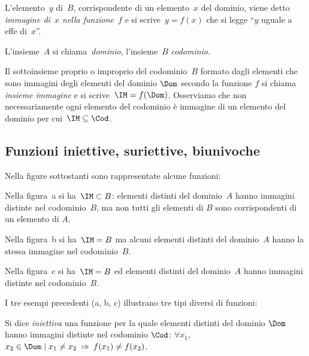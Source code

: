 \begin{definizione}\label{def:immagine_di_f}
 L'elemento~$y$ di~$B$, corrispondente di un elemento~$x$ del dominio, viene detto \emph{immagine di~$x$ nella funzione~$f$} e
si scrive~$y = f(x)$ che si legge ``$y$ uguale a effe di~$x$''.
\end{definizione}

L'insieme~$A$ si chiama~\emph{dominio}, l'insieme~$B$ \emph{codominio}.

Il sottoinsieme proprio o improprio del codominio~$B$ formato dagli elementi che sono
immagini degli elementi del dominio $\Dom$ secondo la funzione $f$ si chiama
\emph{insieme immagine} e si scrive~$\IM = f(\Dom)$. Osserviamo che non necessariamente
ogni elemento del codominio è immagine di un elemento del dominio per cui~$\IM\subseteq \Cod$.

 \vspazio\ovalbox{\risolvii \ref{ese:8.1}, \ref{ese:8.2}, \ref{ese:8.3}}

\subsection{Funzioni iniettive, suriettive, biunivoche}

\begin{exrig}
 \begin{esempio}
Nella figure sottostanti sono rappresentate alcune funzioni:
\begin{center}
 
\end{center}

Nella figura~a si ha~$\IM\subset B$: elementi distinti del dominio~$A$ hanno immagini distinte nel codominio~$B$, ma non tutti gli elementi di $B$ sono corrispondenti di un elemento di $A$.

Nella figura~b si ha~$\IM=B$ ma alcuni elementi distinti del dominio~$A$ hanno la stessa immagine nel codominio~$B$.

Nella figura~c si ha~$\IM=B$ ed elementi distinti del dominio~$A$ hanno immagini distinte nel codominio~$B$.
 \end{esempio}
\end{exrig}

I tre esempi precedenti (a, b, c) illustrano tre tipi diversi di funzioni:

\begin{definizione}
Si dice \emph{iniettiva} una funzione per la quale elementi distinti del
dominio $\Dom$ hanno immagini distinte nel codominio $\Cod$: $\forall x_1$, $x_2 \in \Dom \mid  x_1\neq x_2 \:\Rightarrow\: f(x_1)\neq f(x_2)$.
\end{definizione}

